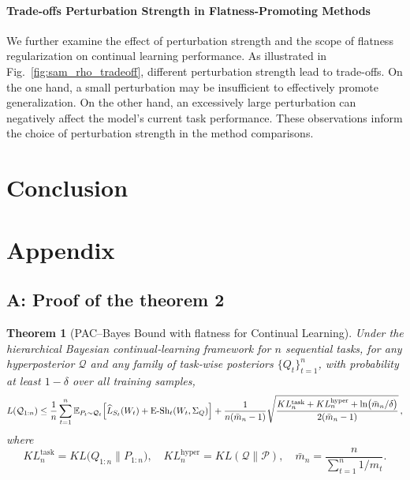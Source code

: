 \documentclass[letterpaper]{article} %
\newtheorem{theorem}{Theorem}
\begin{document}
\paragraph{Trade-offs Perturbation Strength in Flatness-Promoting Methods} We further examine the effect of perturbation strength and the scope of flatness regularization on continual learning performance.
As illustrated in Fig.~\ref{fig:sam_rho_tradeoff}, different perturbation strength lead to  trade-offs. On the one hand, a small perturbation may be insufficient to effectively promote generalization. On the other hand, an excessively large perturbation can negatively affect the model's current task performance. These observations inform the choice of perturbation strength in the method comparisons.


\section{Conclusion}







\appendix




% 






\onecolumn
\section{Appendix}

\subsection{A: Proof of the theorem 2}

\begin{theorem}[PAC--Bayes Bound with flatness for  Continual Learning]
\label{thm:general-pacbayes-eng}
Under the hierarchical Bayesian continual‐learning framework for $n$ sequential tasks, for any hyperposterior $\mathcal Q$ and any family of task‐wise posteriors $\{Q_t\}_{t=1}^n$, with probability at least $1-\delta$ over all training samples,
\[
L(\mathcal Q_{1:n})
\leq
\frac{1}{n}\sum_{t=1}^n\mathbb{E}_{P_t\sim\mathcal Q_t}\Bigl[
   \widehat L_{S_t}(W_t)+\mathrm{E\text{-}Sh}_t(W_t,\Sigma_Q)
\Bigr]
+\frac{1}{n(\bar m_n-1)}
\sqrt{\frac{KL^{\mathrm{task}}_n + KL^{\mathrm{hyper}}_n + \ln\bigl(\bar m_n/\delta\bigr)}{2(\bar m_n-1)}}\,,
\]
where
\[
KL^{\mathrm{task}}_n = KL\bigl(Q_{1:n}\|P_{1:n}\bigr),
\quad
KL^{\mathrm{hyper}}_n = KL(\mathcal Q\|\mathcal P),
\quad
\bar m_n = \frac{n}{\sum_{t=1}^n 1/m_t}.
\]
\end{theorem}
\end{document}
